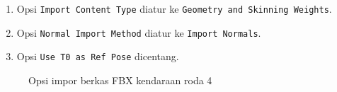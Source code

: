 \begin{enumerate}
    \item Opsi \verb|Import Content Type| diatur ke \texttt{Geometry and Skinning Weights}.
    \item Opsi \verb|Normal Import Method| diatur ke \verb|Import Normals|.
    \item Opsi \verb|Use T0 as Ref Pose| dicentang.
\end{enumerate}

\begin{figure}[!ht]
    \centering
    \hfill
    \caption{Opsi impor berkas FBX kendaraan roda 4}
    \label{fig:fbx-import-options-4wheeled}
\end{figure}

